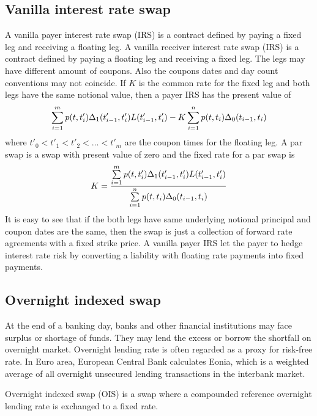 \subsection{Vanilla interest rate swap}

A vanilla payer interest rate swap (IRS) is a contract defined by paying a fixed leg and receiving a floating leg. A vanilla receiver interest rate swap (IRS) is a contract defined by paying a floating leg and receiving a fixed leg. The legs may have different amount of coupons. Also the coupons dates and day count conventions may not coincide. If $K$ is the common rate for the fixed leg and both legs have the same notional value, then a payer IRS has the present value of
  	\begin{align}
		 \sum_{i=1}^m p (t,t'_i) \Delta_1(t'_{i-1}, t'_i) L(t'_{i-1}, t'_i) - K \sum_{i=1}^n p (t,t_i) \Delta_0(t_{i-1}, t_i)
	\end{align}
where $t'_0 < t'_1 < t'_2 < \ldots < t'_m$ are the coupon times for the floating leg. A par swap is a swap with present value of zero and the fixed rate for a par swap is 
  	\begin{align}
		K = \frac{ \sum\limits_{i=1}^m p (t,t'_i) \Delta_1(t'_{i-1}, t'_i) L(t'_{i-1}, t'_i) }{ \sum\limits_{i=1}^n p (t,t_i) \Delta_0(t_{i-1}, t_i) }
	\end{align}
It is easy to see that if the both legs have same underlying notional principal and coupon dates are the same, then the swap is just a collection of forward rate agreements with a fixed strike price. A vanilla payer IRS let the payer to hedge interest rate risk by converting a liability with floating rate payments into fixed payments.

\subsection{Overnight indexed swap}

At the end of a banking day, banks and other financial institutions may face surplus or shortage of funds. They may lend the excess or borrow the shortfall on overnight market. Overnight lending rate is often regarded as a proxy for risk-free rate. In Euro area, European Central Bank calculates Eonia, which is a weighted average of all overnight unsecured lending transactions in the interbank market.

Overnight indexed swap (OIS) is a swap where a compounded reference overnight lending rate is exchanged to a fixed rate.

